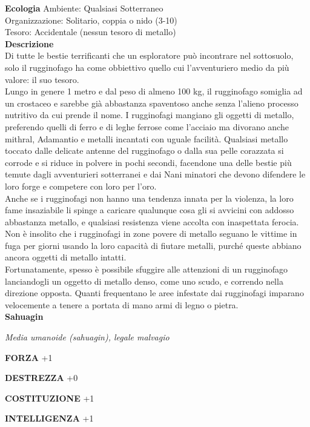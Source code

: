 \begin{multicols}{2}
\textbf{Ecologia}
Ambiente: Qualsiasi Sotterraneo\\
Organizzazione: Solitario, coppia o nido (3-10)\\
Tesoro: Accidentale (nessun tesoro di metallo)\\
\textbf{Descrizione}\\
Di tutte le bestie terrificanti che un esploratore può incontrare nel sottosuolo, solo il rugginofago ha come obbiettivo quello cui l'avventuriero medio da più valore: il suo tesoro.\\
Lungo in genere 1 metro e dal peso di almeno 100 kg, il rugginofago somiglia ad un crostaceo e sarebbe già abbastanza spaventoso anche senza l'alieno processo nutritivo da cui prende il nome. I rugginofagi mangiano gli oggetti di metallo, preferendo quelli di ferro e di leghe ferrose come l'acciaio ma divorano anche mithral, Adamantio e metalli incantati con uguale facilità. Qualsiasi metallo toccato dalle delicate antenne del rugginofago o dalla sua pelle corazzata si corrode e si riduce in polvere in pochi secondi, facendone una delle bestie più temute dagli avventurieri sotterranei e dai Nani minatori che devono difendere le loro forge e competere con loro per l'oro.\\
Anche se i rugginofagi non hanno una tendenza innata per la violenza, la loro fame insaziabile li spinge a caricare qualunque cosa gli si avvicini con addosso abbastanza metallo, e qualsiasi resistenza viene accolta con inaspettata ferocia. Non è insolito che i rugginofagi in zone povere di metallo seguano le vittime in fuga per giorni usando la loro capacità di fiutare metalli, purché queste abbiano ancora oggetti di metallo intatti.\\
Fortunatamente, spesso è possibile sfuggire alle attenzioni di un rugginofago lanciandogli un oggetto di metallo denso, come uno scudo, e correndo nella direzione opposta. Quanti frequentano le aree infestate dai rugginofagi imparano velocemente a tenere a portata di mano armi di legno o pietra.\\



\medskip{}\textbf{Sahuagin}

\emph{Media umanoide (sahuagin), legale malvagio}

\textbf{FORZA} +1

\textbf{DESTREZZA} +0

\textbf{COSTITUZIONE} +1

\textbf{INTELLIGENZA} +1


\end{multicols}
